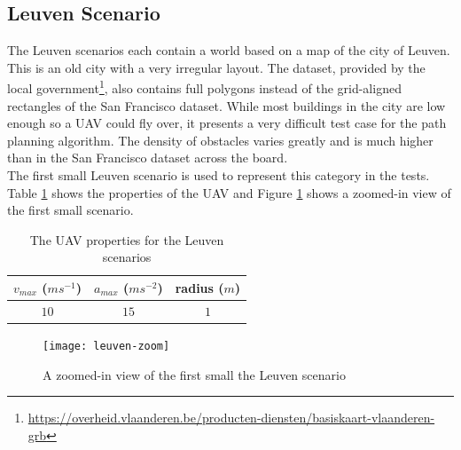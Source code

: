 \subsection{Leuven Scenario}
\label{subsec:leuven}
The Leuven scenarios each contain a world based on a map of the city of Leuven. This is an old city with a very irregular layout. The dataset, provided by the local government\footnote{\url{https://overheid.vlaanderen.be/producten-diensten/basiskaart-vlaanderen-grb}}, also contains full polygons instead of the grid-aligned rectangles of the San Francisco dataset. While most buildings in the city are low enough so a UAV could fly over, it presents a very difficult test case for the path planning algorithm. The density of obstacles varies greatly and is much higher than in the San Francisco dataset across the board.\\
The first small Leuven scenario is used to represent this category in the tests. Table \ref{table:uav-leuven} shows the properties of the UAV and Figure \ref{fig:leuven-zoom} shows a zoomed-in view of the first small scenario. 
\begin{table}[h]
\centering
\begin{tabular}{ c | c | c }
$v_{max}$ ($ms^{-1}$)	& $a_{max}$ ($ms^{-2}$) 	& radius ($m$) 	 \\
\hline
$10$ & $15$ 	& $1$ \\
\end{tabular}
\caption{The UAV properties for the Leuven scenarios}
\label{table:uav-leuven}
\end{table}

\begin{figure}[h]
	\centering
	\texttt{[image: leuven-zoom]}
	\caption{A zoomed-in view of the first small the Leuven scenario}
	\label{fig:leuven-zoom}
\end{figure}



